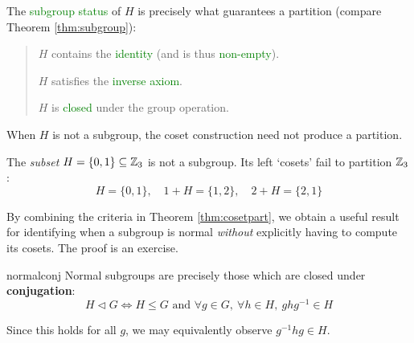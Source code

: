 The \textcolor{Green}{subgroup status} of $H$ is precisely what guarantees a partition (compare Theorem \ref{thm:subgroup}):
\begin{quote}
	\begin{description}\itemsep2pt
		\item[\normalfont\emph{Reflexivity}:]  $H$ contains the \textcolor{Green}{identity} (and is thus \textcolor{Green}{non-empty}).
		\item[\normalfont\emph{Symmetry}:] $H$ satisfies the \textcolor{Green}{inverse axiom}.
		\item[\normalfont\emph{Transitivity}:] $H$ is \textcolor{Green}{closed} under the group operation.
	\end{description}
\end{quote}

When $H$ is not a subgroup, the coset construction need not produce a partition.

\begin{example}{}{}
	The \emph{subset} $H=\{0,1\}\subseteq\mathbb{Z}_3$ is not a subgroup. Its left `cosets' fail to partition $\mathbb{Z}_3$:
	\[
		H=\{0,1\},\quad 1+H=\{1,2\},\quad 2+H=\{2,1\}
	\]
\end{example}


\goodbreak

By combining the criteria in Theorem \ref{thm:cosetpart}, we obtain a useful result for identifying when a subgroup is normal \emph{without} explicitly having to compute its cosets. The proof is an exercise.

\begin{cor}{}{normalconj}
	Normal subgroups are precisely those which are closed under \textbf{conjugation}:
  \[
  	H\triangleleft G\iff H\le G\text{ and \ }\forall g\in G,\ \forall h\in H, \	gh g^{-1}\in H
  \]
\end{cor}

Since this holds for all $g$, we may equivalently observe $g^{-1}hg\in H$. 



